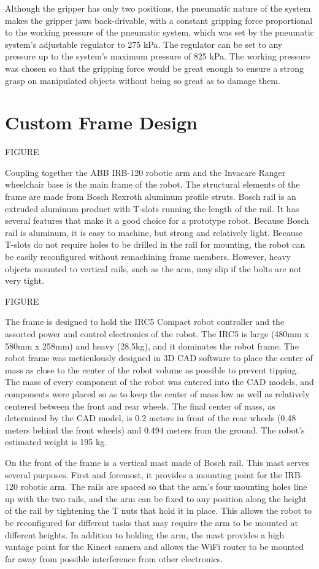 \documentclass[]{cwru} %
\begin{document}
Although the gripper has only two positions, the pneumatic nature of the
system makes the gripper jaws back-drivable, with a constant gripping
force proportional to the working pressure of the pneumatic system,
which was set by the pneumatic system's adjustable regulator to 275 kPa.
The regulator can be set to any pressure up to the system's maximum
pressure of 825 kPa. The working pressure was chosen so that the
gripping force would be great enough to ensure a strong grasp on
manipulated objects without being so great as to damage
them.

\chapter{Custom Frame Design}

FIGURE

Coupling together the ABB IRB-120 robotic arm and the Invacare Ranger
wheelchair base is the main frame of the robot. The structural elements
of the frame are made from Bosch Rexroth aluminum profile struts. Bosch
rail is an extruded aluminum product with T-slots running the length of
the rail. It has several features that make it a good choice for a
prototype robot. Because Bosch rail is aluminum, it is easy to machine,
but strong and relatively light. Because T-slots do not require holes to
be drilled in the rail for mounting, the robot can be easily
reconfigured without remachining frame members. However, heavy objects
mounted to vertical rails, such as the arm, may slip if the bolts are
not very tight.

FIGURE

The frame is designed to hold the IRC5 Compact robot controller and the
assorted power and control electronics of the robot. The IRC5 is large
(480mm x 580mm x 258mm) and heavy (28.5kg), and it dominates the robot
frame. The robot frame was meticulously designed in 3D CAD software to
place the center of mass as close to the center of the robot volume as
possible to prevent tipping. The mass of every component of the robot
was entered into the CAD models, and components were placed so as to
keep the center of mass low as well as relatively centered between the
front and rear wheels. The final center of mass, as determined by the
CAD model, is 0.2 meters in front of the rear wheels (0.48 meters behind
the front wheels) and 0.494 meters from the ground. The robot's
estimated weight is 195 kg.

On the front of the frame is a vertical mast made of Bosch rail. This
mast serves several purposes. First and foremost, it provides a mounting
point for the IRB-120 robotic arm. The rails are spaced so that the
arm's four mounting holes line up with the two rails, and the arm can be
fixed to any position along the height of the rail by tightening the T
nuts that hold it in place. This allows the robot to be reconfigured for
different tasks that may require the arm to be mounted at different
heights. In addition to holding the arm, the mast provides a high
vantage point for the Kinect camera and allows the WiFi router to be
mounted far away from possible interference from other electronics.
\end{document}
